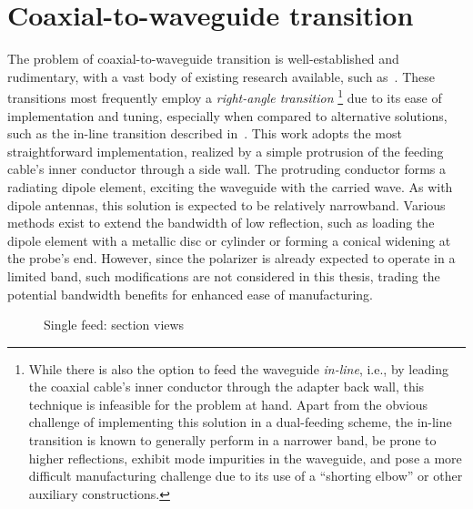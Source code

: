 \documentclass[14pt,a4paper]{ntust_report}
\newlength{\twosubht}
\begin{document}
\section{Coaxial-to-waveguide transition}
\label{section:coaxial-to-waveguide-transition}
The problem of coaxial-to-waveguide transition is well-established and rudimentary, with a vast body of existing research available, such as~\parencite{fabregas-et-al:coaxial-to-rectangular-waveguide-transitions}. These transitions most frequently employ a \emph{right-angle transition}%
    \footnote{While there is also the option to feed the waveguide \emph{in-line}, i.e., by leading the coaxial cable's inner conductor through the adapter back wall, this technique is infeasible for the problem at hand. Apart from the obvious challenge of implementing this solution in a dual-feeding scheme, the in-line transition is known to generally perform in a narrower band, be prone to higher reflections, exhibit mode impurities in the waveguide, and pose a more difficult manufacturing challenge due to its use of a \enquote{shorting elbow} or other auxiliary constructions.}
due to its ease of implementation and tuning, especially when compared to alternative solutions, such as the in-line transition described in~\parencite{durga-et-al:millimiter-wave-inline-coaxial-to-rectangular-waveguide-transition}. This work adopts the most straightforward implementation, realized by a simple protrusion of the feeding cable's inner conductor through a side wall. The protruding conductor forms a radiating dipole element, exciting the waveguide with the carried wave. As with dipole antennas, this solution is expected to be relatively narrowband. Various methods exist to extend the bandwidth of low reflection, such as loading the dipole element with a metallic disc or cylinder or forming a conical widening at the probe's end. However, since the polarizer is already expected to operate in a limited band, such modifications are not considered in this thesis, trading the potential bandwidth benefits for enhanced ease of manufacturing.

\begin{figure}[!ht]
    \sbox{}
    \setlength{\twosubht}{\ht\twosubbox}

    \centering
    \quad
    \caption{\label{fig:single-feed-model}Single feed: section views}
\end{figure}
\end{document}
